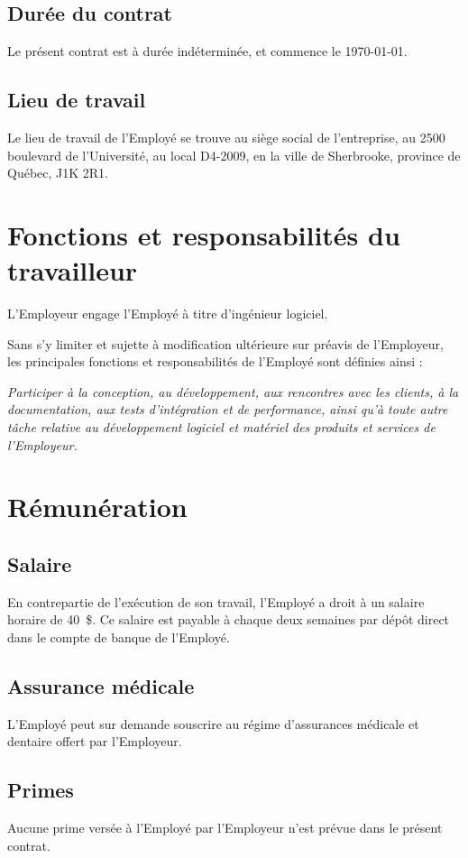 \documentclass{article}
\begin{document}
        \subsection{Durée du contrat}
	    Le présent contrat est à durée indéterminée, et commence le \today.
        	
    	\subsection{Lieu de travail}
    	Le lieu de travail de l'Employé se trouve au siège social de l'entreprise, au 2500 boulevard de l'Université, au local D4-2009, en la ville de Sherbrooke, province de Québec, J1K 2R1.
    	
   \section{Fonctions et responsabilités du travailleur}
   	L'Employeur engage l'Employé à titre d'ingénieur logiciel.

    Sans s'y limiter et sujette à modification ultérieure sur préavis de l'Employeur, les principales fonctions et responsabilités de l'Employé sont définies ainsi :
    	
    	\emph{Participer à la conception, au développement, aux rencontres avec les clients, à la documentation, aux tests d'intégration et de performance, ainsi qu'à toute autre tâche relative au développement logiciel et matériel des produits et services de l'Employeur.}
    
    \section{Rémunération}
    	\subsection{Salaire}
    	En contrepartie de l'exécution de son travail, l'Employé a droit à un salaire horaire de \SI{40}{\$}. Ce salaire est payable à chaque deux semaines par dépôt direct dans le compte de banque de l'Employé.
    	
    	\subsection{Assurance médicale}
    	L'Employé peut sur demande souscrire au régime d'assurances médicale et dentaire offert par l'Employeur.
    	
    	\subsection{Primes}
    	Aucune prime versée à l'Employé par l'Employeur n'est prévue dans le présent contrat.
    	
\end{document}

